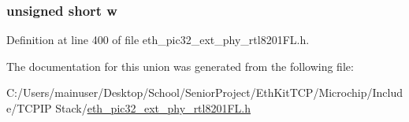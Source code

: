 \subsubsection[{w}]{\setlength{\rightskip}{0pt plus 5cm}unsigned short w}\label{union___i_n_t___w_o_l___l_e_d_s__t_a160850a4684a3e82c2323033964f2e98}


Definition at line 400 of file eth\+\_\+pic32\+\_\+ext\+\_\+phy\+\_\+rtl8201\+F\+L.\+h.



The documentation for this union was generated from the following file\+:\begin{DoxyCompactItemize}
\item 
C\+:/\+Users/mainuser/\+Desktop/\+School/\+Senior\+Project/\+Eth\+Kit\+T\+C\+P/\+Microchip/\+Include/\+T\+C\+P\+I\+P Stack/\hyperlink{eth__pic32__ext__phy__rtl8201_f_l_8h}{eth\+\_\+pic32\+\_\+ext\+\_\+phy\+\_\+rtl8201\+F\+L.\+h}\end{DoxyCompactItemize}
